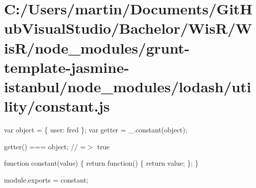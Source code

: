 \hypertarget{_c_1_2_users_2martin_2_documents_2_git_hub_visual_studio_2_bachelor_2_wis_r_2_wis_r_2node_module52582e7307406ecf6afad5add7ea05e2}{}\section{C\+:/\+Users/martin/\+Documents/\+Git\+Hub\+Visual\+Studio/\+Bachelor/\+Wis\+R/\+Wis\+R/node\+\_\+modules/grunt-\/template-\/jasmine-\/istanbul/node\+\_\+modules/lodash/utility/constant.\+js}
var object = \{ \textquotesingle{}user\textquotesingle{}\+: \textquotesingle{}fred\textquotesingle{} \}; var getter = \+\_\+.\+constant(object);

getter() === object; // =$>$ true


\begin{DoxyCodeInclude}

\textcolor{keyword}{function} constant(value) \{
  \textcolor{keywordflow}{return} \textcolor{keyword}{function}() \{
    \textcolor{keywordflow}{return} value;
  \};
\}

module.exports = constant;
\end{DoxyCodeInclude}
 